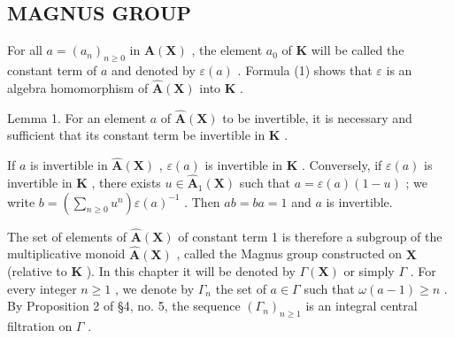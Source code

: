 \subsection{MAGNUS GROUP}

For all \(a = (a_n)_{n \geq 0}\) in \(\hat{\mathbf{A}}(\mathbf{X})\) , the element \(a_0\) of \(\mathbf{K}\) will be called the constant term of \(a\) and denoted by \(\varepsilon(a)\) . Formula (1) shows that \(\varepsilon\) is an algebra homomorphism of \(\hat{\mathbf{A}}(\mathbf{X})\) into \(\mathbf{K}\) .

Lemma 1. For an element \(a\) of \(\hat{\mathbf{A}}(\mathbf{X})\) to be invertible, it is necessary and sufficient that its constant term be invertible in \(\mathbf{K}\) .

If \(a\) is invertible in \(\hat{\mathbf{A}}(\mathbf{X})\) , \(\varepsilon(a)\) is invertible in \(\mathbf{K}\) . Conversely, if \(\varepsilon(a)\) is invertible in \(\mathbf{K}\) , there exists \(u \in \hat{\mathbf{A}}_1(\mathbf{X})\) such that \(a = \varepsilon(a)(1 - u)\) ; we write \(b = \left(\sum_{n \geqslant 0} u^n\right)\varepsilon(a)^{-1}\) . Then \(ab = ba = 1\) and \(a\) is invertible.

The set of elements of \(\hat{\mathbf{A}}(\mathbf{X})\) of constant term 1 is therefore a subgroup of the multiplicative monoid \(\hat{\mathbf{A}}(\mathbf{X})\) , called the Magnus group constructed on \(\mathbf{X}\) (relative to \(\mathbf{K}\) ). In this chapter it will be denoted by \(\Gamma(\mathbf{X})\) or simply \(\Gamma\) . For every integer \(n \geqslant 1\) , we denote by \(\Gamma_n\) the set of \(a \in \Gamma\) such that \(\omega(a - 1) \geqslant n\) . By Proposition 2 of §4, no. 5, the sequence \((\Gamma_n)_{n \geqslant 1}\) is an integral central filtration on \(\Gamma\) .

